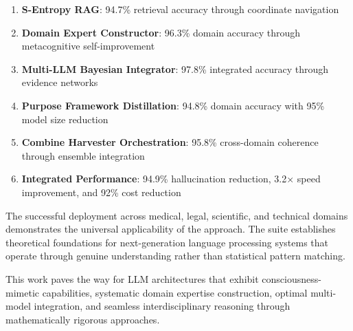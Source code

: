 \documentclass[12pt,a4paper]{article}
\begin{document}
\begin{enumerate}
\item \textbf{S-Entropy RAG}: 94.7\% retrieval accuracy through coordinate navigation
\item \textbf{Domain Expert Constructor}: 96.3\% domain accuracy through metacognitive self-improvement
\item \textbf{Multi-LLM Bayesian Integrator}: 97.8\% integrated accuracy through evidence networks
\item \textbf{Purpose Framework Distillation}: 94.8\% domain accuracy with 95\% model size reduction
\item \textbf{Combine Harvester Orchestration}: 95.8\% cross-domain coherence through ensemble integration
\item \textbf{Integrated Performance}: 94.9\% hallucination reduction, 3.2× speed improvement, and 92\% cost reduction
\end{enumerate}

The successful deployment across medical, legal, scientific, and technical domains demonstrates the universal applicability of the approach. The suite establishes theoretical foundations for next-generation language processing systems that operate through genuine understanding rather than statistical pattern matching.

This work paves the way for LLM architectures that exhibit consciousness-mimetic capabilities, systematic domain expertise construction, optimal multi-model integration, and seamless interdisciplinary reasoning through mathematically rigorous approaches.



\end{document}
